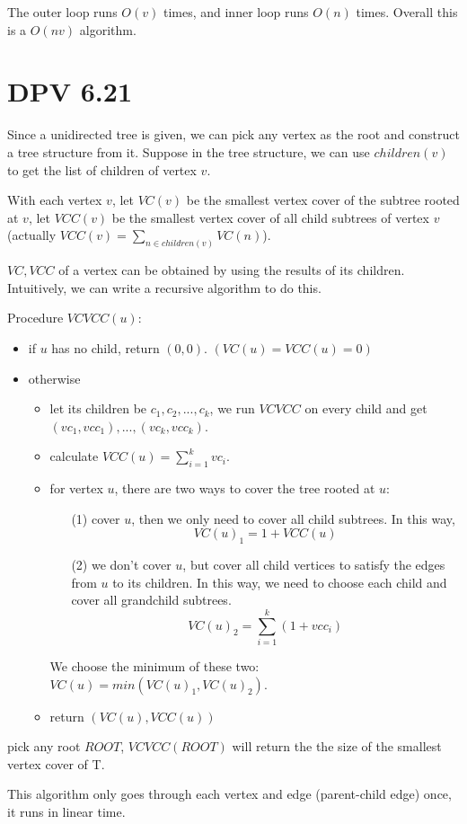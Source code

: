 \documentclass[twoside]{homework}
\begin{document}
The outer loop runs $O(v)$ times, and inner loop runs $O(n)$ times. Overall this is a $O(nv)$ algorithm.


\section{DPV 6.21}
Since a unidirected tree is given, we can pick any vertex as the root and construct a tree structure from it. Suppose in the tree structure, we can use $children(v)$ to get the list of children of vertex $v$.

With each vertex $v$, let $VC(v)$ be the smallest vertex cover of the subtree rooted at $v$, let $VCC(v)$ be the smallest vertex cover of all child subtrees of vertex $v$ (actually $VCC(v) = \sum_{n \in children(v)} VC(n)$).

$VC, VCC$ of a vertex can be obtained by using the results of its children. Intuitively, we can write a recursive algorithm to do this.

Procedure $VCVCC(u)$:
\begin{itemize}
	\item if $u$ has no child, return $(0, 0)$. $(VC(u) = VCC(u) = 0)$
	\item otherwise
		\begin{itemize}
			\item let its children be $c_1, c_2, ..., c_k$, we run $VCVCC$ on every child and get $(vc_1, vcc_1), ..., (vc_k, vcc_k)$.
			\item calculate $VCC(u) = \sum_{i=1}^k vc_i$.
			\item for vertex $u$, there are two ways to cover the tree rooted at $u$:
				\begin{enumerate}
					\item [(1)] cover $u$, then we only need to cover all child subtrees. In this way,
						\[ VC(u)_1 = 1 + VCC(u) \]
					\item [(2)] we don't cover $u$, but cover all child vertices to satisfy the edges from $u$ to its children. In this way, we need to choose each child and cover all grandchild subtrees.
						\[ VC(u)_2 = \sum_{i=1}^k (1 + vcc_i)\]
				\end{enumerate}
				We choose the minimum of these two: $VC(u) = min(VC(u)_1, VC(u)_2)$.
			\item return $(VC(u), VCC(u))$
	\end{itemize}
\end{itemize}
pick any root $ROOT$, $VCVCC(ROOT)$ will return the the size of the smallest vertex cover of T.

This algorithm only goes through each vertex and edge (parent-child edge) once, it runs in linear time.
\end{document}
